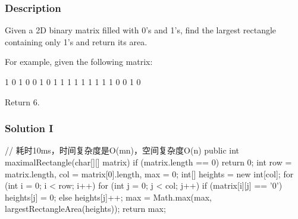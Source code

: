 \subsubsection{Description}
Given a 2D binary matrix filled with 0's and 1's, find the largest rectangle containing only 1's and return its area.

For example, given the following matrix:
\begin{Code}
1 0 1 0 0
1 0 1 1 1
1 1 1 1 1
1 0 0 1 0
\end{Code}

Return 6.

\subsubsection{Solution I}

\begin{Code}
// 耗时10ms，时间复杂度是O(mn)，空间复杂度O(n)
public int maximalRectangle(char[][] matrix) {
    if (matrix.length == 0) {
        return 0;
    }
    int row = matrix.length, col = matrix[0].length, max = 0;
    int[] heights = new int[col];
    for (int i = 0; i < row; i++) {
        for (int j = 0; j < col; j++) {
            if (matrix[i][j] == '0') {
                heights[j] = 0;
            } else {
                heights[j]++;
            }
        }
        max = Math.max(max, largestRectangleArea(heights));
    }
    return max;
}
\end{Code}

\newpage

